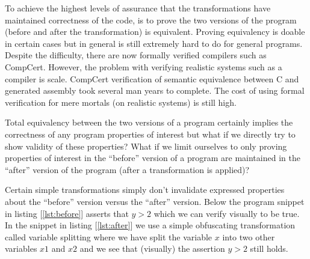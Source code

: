 \documentclass[compsoc,conference,a4paper,10pt,times]{IEEEtran}
\begin{document}
To achieve the highest levels of assurance that the transformations have maintained correctness of the code, is to prove the two versions of the program (before and after the transformation) is equivalent. Proving equivalency is doable in certain cases but in general is still extremely hard to do for general programs. Despite the difficulty, there are now formally verified compilers such as CompCert. However, the problem with verifying realistic systems such as a compiler is scale. CompCert verification of semantic equivalence between C and generated assembly took several man years to complete. The cost of using formal verification for mere mortals (on realistic systems) is still high. 

Total equivalency between the two versions of a program certainly implies the correctness of any program properties of interest but what if we directly try to show validity of these properties? What if we limit ourselves to only proving properties of interest in the ``before'' version of a program are maintained in the ``after'' version of the program (after a transformation is applied)? 

Certain simple transformations simply don't invalidate expressed properties about the ``before'' version versus the ``after'' version. Below the program snippet in listing [\ref{lst:before}] asserts that $y > 2$ which we can verify visually to be true. In the snippet in listing [\ref{lst:after}] we use a simple obfuscating transformation called variable splitting where we have split the variable $x$ into two other variables $x1$ and $x2$ and we see that (visually) the assertion $y > 2$ still holds.



\end{document}
